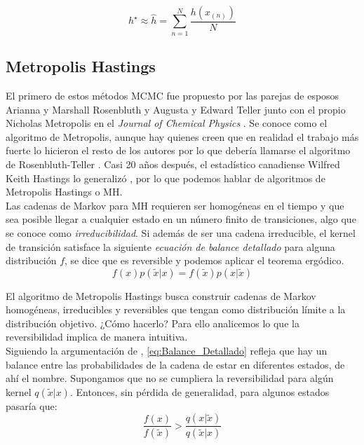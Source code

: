 \begin{equation*}
h^\star \approx \hat{h} = \sum\limits_{n=1}^N \dfrac{h(x_{(n)})}{N}
\end{equation*}

\subsection{Metropolis Hastings}

 El primero de estos métodos MCMC fue propuesto por las parejas de esposos Arianna y Marshall Rosenbluth y Augusta y Edward Teller junto con el propio Nicholas Metropolis en el \textit{Journal of Chemical Physics} \parencite{Metropolis53}. Se conoce como el algoritmo de Metropolis, aunque hay quienes creen que en realidad el trabajo más fuerte lo hicieron el resto de los autores por lo que debería llamarse el algoritmo de Rosenbluth-Teller \parencite{Gubernatis05}. Casi 20 años después, el estadístico canadiense Wilfred Keith Hastings lo generalizó \parencite{Hastings70}, por lo que podemos hablar de algoritmos de Metropolis Hastings o MH.\\
 
Las cadenas de Markov para MH requieren ser homogéneas en el tiempo y que sea posible llegar a cualquier estado en un número finito de transiciones, algo que se conoce como \textit{irreducibilidad}. Si además de ser una cadena irreducible, el kernel de transición satisface la siguiente \textit{ecuación de balance detallado} para alguna distribución $f$, se dice que es reversible y podemos aplicar el teorema ergódico.
\begin{equation}
\label{eq:Balance_Detallado}
f(x)p(\tilde{x}|x)=f(\tilde{x})p(x|\tilde{x})
\end{equation}

El algoritmo de Metropolis Hastings busca construir cadenas de Markov homogéneas, irreducibles y reversibles que tengan como distribución límite a la distribución objetivo. ¿Cómo hacerlo? Para ello analicemos lo que la reversibilidad implica de manera intuitiva.\\

Siguiendo la argumentación de \textcite{ChibGreenberg95}, \eqref{eq:Balance_Detallado} refleja que hay un balance entre las probabilidades de la cadena de estar en diferentes estados, de ahí el nombre. Supongamos que no se cumpliera la reversibilidad para algún kernel $q(\tilde{x}|x)$. Entonces, sin pérdida de generalidad, para algunos estados pasaría que:
\begin{equation}
\label{eq:Inbalance_Detallado}
\dfrac{f(x)}{f(\tilde{x})}>\dfrac{q(x|\tilde{x})}{q(\tilde{x}|x)}
\end{equation}

